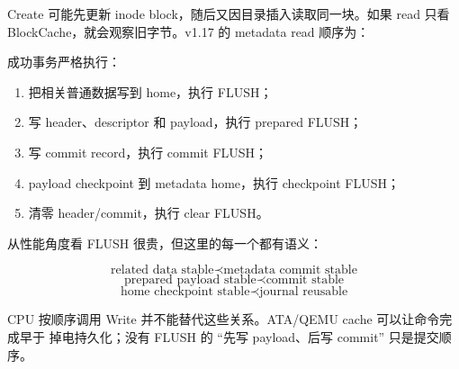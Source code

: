 Create 可能先更新 inode block，随后又因目录插入读取同一块。如果 read 只看
BlockCache，就会观察旧字节。v1.17 的 metadata read 顺序为：

\begin{center}
\end{center}

成功事务严格执行：

\begin{enumerate}
  \item 把相关普通数据写到 home，执行 FLUSH；
  \item 写 header、descriptor 和 payload，执行 prepared FLUSH；
  \item 写 commit record，执行 commit FLUSH；
  \item payload checkpoint 到 metadata home，执行 checkpoint FLUSH；
  \item 清零 header/commit，执行 clear FLUSH。
\end{enumerate}

从性能角度看 FLUSH 很贵，但这里的每一个都有语义：

\[
\text{related data stable}
\prec
\text{metadata commit stable}
\]
\[
\text{prepared payload stable}
\prec
\text{commit stable}
\]
\[
\text{home checkpoint stable}
\prec
\text{journal reusable}
\]

CPU 按顺序调用 Write 并不能替代这些关系。ATA/QEMU cache 可以让命令完成早于
掉电持久化；没有 FLUSH 的 ``先写 payload、后写 commit'' 只是提交顺序。

